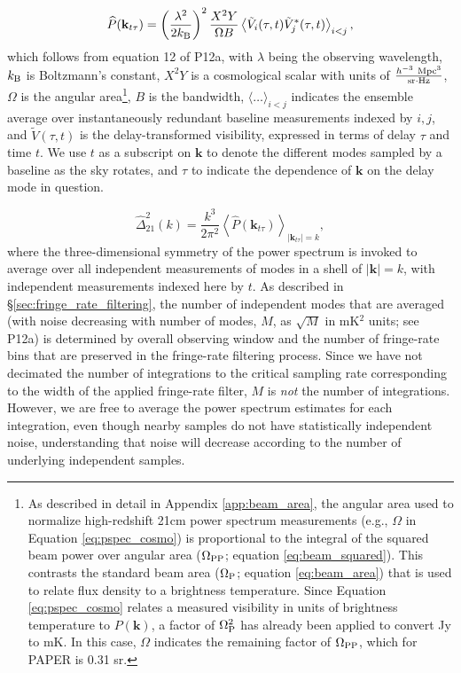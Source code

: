 \documentclass[twocolumn,numberedappendix]{emulateapj}
\def\k{\mathbf{k}}
\begin{document}
\begin{equation}
\widehat P(\k_{t\tau}) = \left(\frac{\lambda^2}{2k_{\rm B}}\right)^2\frac{X^2Y}{\Omega B}
\left\langle{\tilde V_i(\tau,t) \tilde V_j^*(\tau,t)}\right\rangle_{i<j},
\label{eq:pspec_cosmo}
\end{equation}
which follows from equation 12 of P12a, with $\lambda$ being the observing
wavelength, $k_{\rm B}$ is Boltzmann's constant, $X^2Y$ is a cosmological scalar with units
of $\frac{h^{-3}\ {\rm Mpc}^3}{{\rm sr}\cdot {\rm Hz}}$, $\Omega$ is the angular 
area\footnote{
As described in detail in Appendix \ref{app:beam_area}, the angular area used to normalize
high-redshift 21cm power spectrum measurements (e.g., $\Omega$ in Equation \ref{eq:pspec_cosmo}) is proportional
to the integral of the squared beam power over angular area ($\Omega_{\rm PP}$; equation \ref{eq:beam_squared}).
This contrasts the standard beam area ($\Omega_{\rm P}$; equation \ref{eq:beam_area}) that is
used to relate flux density to a brightness temperature.
Since Equation \ref{eq:pspec_cosmo} 
relates a measured visibility in units of brightness
temperature to $P(\k)$, a factor of $\Omega_{\rm P}^2$ has already been
applied to convert Jy to mK.  In this case,
$\Omega$ indicates the remaining factor of $\Omega_{\rm PP}$, which for PAPER is 0.31 sr.},
$B$ is the bandwidth, $\langle\dots\rangle_{i<j}$ indicates the ensemble average
over instantaneously redundant baseline measurements indexed by $i,j$,
and $\tilde V(\tau,t)$ is the delay-transformed visibility,
expressed in terms of delay $\tau$ and time $t$.
We use $t$ as a subscript on $\k$
to denote the different modes sampled by a baseline as the sky rotates, and $\tau$ to indicate
the dependence of $\k$ on the delay mode in question.

\begin{equation}
\widehat \Delta^2_{21}(k) = \frac{k^3}{2\pi^2}\left\langle \widehat P(\k_{t\tau})\right\rangle_{|\k_{t\tau}|=k},
\end{equation}
where the three-dimensional symmetry of the power spectrum is invoked to average over
all independent measurements of modes in a shell of $|\k|=k$, with independent measurements
indexed here by $t$.  As described in \S\ref{sec:fringe_rate_filtering}, the number of independent modes
that are averaged (with noise decreasing with number of modes, $M$, as $\sqrt{M}$ in mK$^2$ units; see P12a) is 
determined
by overall observing window and the number of fringe-rate bins that are 
preserved in the fringe-rate filtering process.
Since we have not decimated the number of integrations to the critical sampling rate corresponding to the 
width of the applied fringe-rate filter, $M$ is {\it not} the number of integrations.  However,
we are free to average the power spectrum estimates for each integration, even though nearby samples
do not have statistically independent noise, understanding that noise will decrease according to the number
of underlying independent samples.
\end{document}
